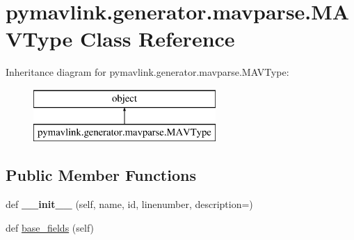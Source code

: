 \hypertarget{classpymavlink_1_1generator_1_1mavparse_1_1MAVType}{}\section{pymavlink.\+generator.\+mavparse.\+M\+A\+V\+Type Class Reference}
\label{classpymavlink_1_1generator_1_1mavparse_1_1MAVType}
Inheritance diagram for pymavlink.\+generator.\+mavparse.\+M\+A\+V\+Type\+:\begin{figure}[H]
\begin{center}
\leavevmode
\includegraphics[height=2.000000cm]{classpymavlink_1_1generator_1_1mavparse_1_1MAVType}
\end{center}
\end{figure}
\subsection*{Public Member Functions}
\begin{DoxyCompactItemize}
\item 
\mbox{\label{classpymavlink_1_1generator_1_1mavparse_1_1MAVType_a2b349bf03d33eb679e249919fb04daef}} 
def {\bfseries \+\_\+\+\_\+init\+\_\+\+\_\+} (self, name, id, linenumber, description=\textquotesingle{}\textquotesingle{})
\item 
def \hyperlink{classpymavlink_1_1generator_1_1mavparse_1_1MAVType_ac07035e475c25d71205939bc52bafcdc}{base\+\_\+fields} (self)
\end{DoxyCompactItemize}
